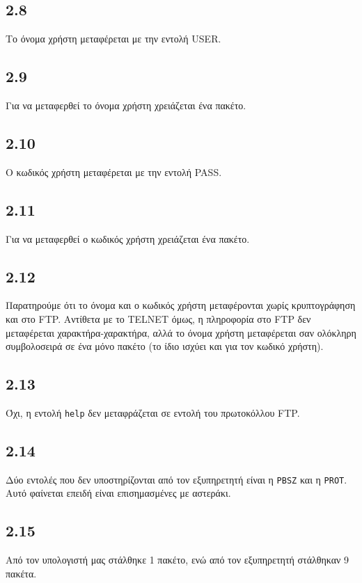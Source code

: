 		
		\subsection*{2.8}
			Το όνομα χρήστη μεταφέρεται με την εντολή USER.
		
		\subsection*{2.9}
			Για να μεταφερθεί το όνομα χρήστη χρειάζεται ένα πακέτο.
		
		\subsection*{2.10}
			Ο κωδικός χρήστη μεταφέρεται με την εντολή PASS.
		
		\subsection*{2.11}
			Για να μεταφερθεί ο κωδικός χρήστη χρειάζεται ένα πακέτο.
		
		\subsection*{2.12}
			Παρατηρούμε ότι το όνομα και ο κωδικός χρήστη μεταφέρονται χωρίς κρυπτογράφηση και στο FTP. Αντίθετα με το TELNET όμως, η πληροφορία στο FTP δεν μεταφέρεται χαρακτήρα-χαρακτήρα, αλλά το όνομα χρήστη μεταφέρεται σαν ολόκληρη συμβολοσειρά σε ένα μόνο πακέτο (το ίδιο ισχύει και για τον κωδικό χρήστη).
		
		\subsection*{2.13}
			Όχι, η εντολή \verb|help| δεν μεταφράζεται σε εντολή του πρωτοκόλλου FTP.
		
		\subsection*{2.14}
			Δύο εντολές που δεν υποστηρίζονται από τον εξυπηρετητή είναι η \verb|PBSZ| και η \verb|PROT|. Αυτό φαίνεται επειδή είναι επισημασμένες με αστεράκι.
		
		\subsection*{2.15}
			Από τον υπολογιστή μας στάλθηκε 1 πακέτο, ενώ από τον εξυπηρετητή στάλθηκαν 9 πακέτα.
		
